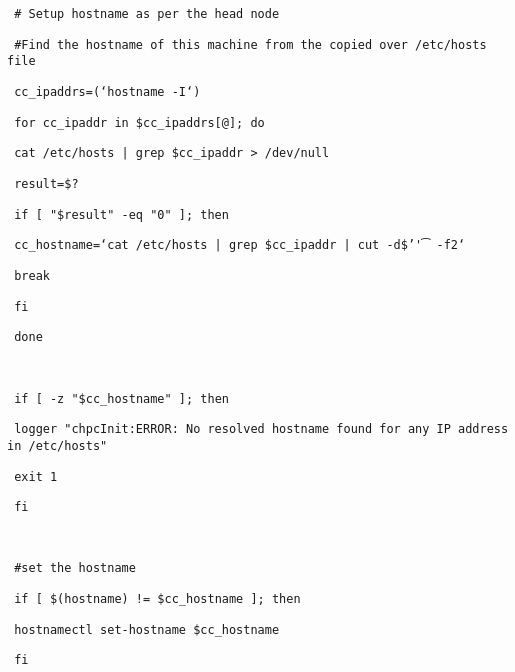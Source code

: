 \begin{section}
\begin{bash}\texttt{\small{ \# Setup hostname as per the head node}}\end{bash}
\begin{bash}\texttt{\small{ \#Find the hostname of this machine from the copied over /etc/hosts file}}\end{bash}
\begin{bash}\texttt{\small{ cc\_ipaddrs=(`hostname -I`)}}\end{bash}
\begin{bash}\texttt{\small{ for cc\_ipaddr in \${cc\_ipaddrs[@]}; do}}\end{bash}
\begin{bash}\texttt{\small{     cat /etc/hosts | grep \${cc\_ipaddr} > /dev/null}}\end{bash}
\begin{bash}\texttt{\small{     result=\$?}}\end{bash}
\begin{bash}\texttt{\small{     if [ "\$result" -eq "0" ]; then}}\end{bash}
\begin{bash}\texttt{\small{         cc\_hostname=`cat /etc/hosts | grep \${cc\_ipaddr} | cut -d\$'\t' -f2`}}\end{bash}
\begin{bash}\texttt{\small{         break}}\end{bash}
\begin{bash}\texttt{\small{     fi}}\end{bash}
\begin{bash}\texttt{\small{ done}}\end{bash}
\begin{bash}\texttt{\small{ }}\end{bash}
\begin{bash}\texttt{\small{ if [ -z "\${cc\_hostname}" ]; then}}\end{bash}
\begin{bash}\texttt{\small{     logger "chpcInit:ERROR: No resolved hostname found for any IP address in /etc/hosts"}}\end{bash}
\begin{bash}\texttt{\small{     exit 1}}\end{bash}
\begin{bash}\texttt{\small{ fi}}\end{bash}
\begin{bash}\texttt{\small{ }}\end{bash}
\begin{bash}\texttt{\small{ \#set the hostname}}\end{bash}
\begin{bash}\texttt{\small{ if [ \$(hostname) != \${cc\_hostname} ]; then}}\end{bash}
\begin{bash}\texttt{\small{     hostnamectl set-hostname \${cc\_hostname}}}\end{bash}
\begin{bash}\texttt{\small{ fi}}\end{bash}


\end{section}
